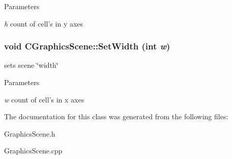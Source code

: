 \begin{DoxyParams}{Parameters}
\item[{\em h}]count of cell's in y axes \end{DoxyParams}
\hypertarget{classCGraphicsScene_a7589adb1bd0809ac71f68f034d32fa5b}{
\subsubsection[{SetWidth}]{\setlength{\rightskip}{0pt plus 5cm}void CGraphicsScene::SetWidth (int {\em w})}}
\label{classCGraphicsScene_a7589adb1bd0809ac71f68f034d32fa5b}
sets scene \char`\"{}width\char`\"{}


\begin{DoxyParams}{Parameters}
\item[{\em w}]count of cell's in x axes \end{DoxyParams}


The documentation for this class was generated from the following files:\begin{DoxyCompactItemize}
\item 
GraphicsScene.h\item 
GraphicsScene.cpp\end{DoxyCompactItemize}
